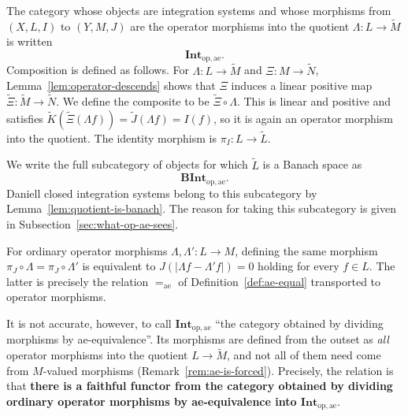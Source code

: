 \begin{definition}\label{def:int-op-ae}
  The category whose objects are integration systems and whose morphisms from
  $(X,L,I)$ to $(Y,M,J)$ are the operator morphisms into the quotient
  $\Lambda:L\to\widetilde{M}$ is written
  \[
    \mathbf{Int}_{\mathrm{op},\mathrm{ae}} .
  \]
  Composition is defined as follows.
  For $\Lambda:L\to\widetilde{M}$ and $\Xi:M\to\widetilde{N}$,
  Lemma~\ref{lem:operator-descends} shows that $\Xi$ induces a linear positive
  map $\widetilde{\Xi}:\widetilde{M}\to\widetilde{N}$.
  We define the composite to be $\widetilde{\Xi}\circ\Lambda$.
  This is linear and positive and satisfies
  $\widetilde{K}(\widetilde{\Xi}(\Lambda f))=\widetilde{J}(\Lambda f)=I(f)$, so
  it is again an operator morphism into the quotient.
  The identity morphism is $\pi_I:L\to\widetilde{L}$.

  We write the full subcategory of objects for which $\widetilde{L}$ is a Banach
  space as
  \[
    \mathbf{BInt}_{\mathrm{op},\mathrm{ae}} .
  \]
  Daniell closed integration systems belong to this subcategory by
  Lemma~\ref{lem:quotient-is-banach}.
  The reason for taking this subcategory is given in
  Subsection~\ref{sec:what-op-ae-sees}.
\end{definition}

\begin{remark}
  For ordinary operator morphisms $\Lambda,\Lambda':L\to M$, defining the same
  morphism $\pi_J\circ\Lambda=\pi_J\circ\Lambda'$ is equivalent to
  $J(|\Lambda f-\Lambda' f|)=0$ holding for every $f\in L$.
  The latter is precisely the relation $=_{\mathrm{ae}}$ of
  Definition~\ref{def:ae-equal} transported to operator morphisms.

  It is not accurate, however, to call
  $\mathbf{Int}_{\mathrm{op},\mathrm{ae}}$ ``the category obtained by dividing
  morphisms by ae-equivalence''.
  Its morphisms are defined from the outset as \emph{all} operator morphisms
  into the quotient $L\to\widetilde{M}$, and not all of them need come from
  $M$-valued morphisms (Remark~\ref{rem:ae-is-forced}).
  Precisely, the relation is that \textbf{there is a faithful functor from the
  category obtained by dividing ordinary operator morphisms by ae-equivalence
  into $\mathbf{Int}_{\mathrm{op},\mathrm{ae}}$}.
\end{remark}

